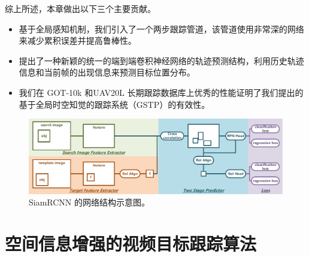 综上所述，本章做出以下三个主要贡献。
\begin{itemize}
\item 基于全局感知机制，我们引入了一个两步跟踪管道，该管道使用非常深的网络来减少累积误差并提高鲁棒性。
\item 提出了一种新颖的统一的端到端卷积神经网络的轨迹预测结构，利用历史轨迹信息和当前帧的出现信息来预测目标位置分布。
\item 我们在 GOT-10k \cite{GOT-10k} 和UAV20L \cite{mueller2016benchmark} 长期跟踪数据库上优秀的性能证明了我们提出的基于全局时空知觉的跟踪系统（GSTP）的有效性。
\end{itemize}

\begin{figure}[t]
    \centering
    \includegraphics[width=1.0\textwidth]{Img/globally/SiamRCNN.pdf}
    \caption{SiamRCNN 的网络结构示意图。}
    \label{fig:siamrcnn}
\end{figure}

\section{空间信息增强的视频目标跟踪算法}

